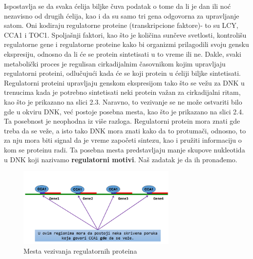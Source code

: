 Ispostavlja se da svaka ćelija biljke čuva podatak o tome da li je dan ili noć nezavisno od drugih ćelija, kao i da su samo tri gena odgovorna za upravljanje satom. Oni kodiraju regulatorne proteine (transkripcione faktore)- to su LCY, CCA1 i TOC1. Spoljašnji faktori, kao što je količina sunčeve svetlosti, kontrolišu regulatorne gene i regulatorne proteine kako bi organizmi prilagodili svoju gensku ekspresiju, odnosno da li će se protein sintetisati u to vreme ili ne. Dakle, svaki metabolički proces je regulisan cirkadijalnim časovnikom kojim upravljaju regulatorni proteini, odlučujući kada će se koji protein u ćeliji biljke sintetisati. Regulatorni proteini upravljaju genskom ekspresijom tako što se vežu za DNK u trenucima kada je potrebno sintetisati neki protein važan za cirkadijalni ritam, kao što je prikazano na slici 2.3. Naravno, to vezivanje se ne može ostvariti bilo gde u okviru DNK, već postoje posebna mesta, kao što je prikazano na slici 2.4. Ta posebnost je neophodna iz više razloga. Regulatorni protein mora znati gde treba da se veže, a isto tako DNK mora znati kako da to protumači, odnosno, to za nju mora biti signal da je vreme započeti sintezu, kao i pružiti informaciju o kom se proteinu radi. Ta posebna mesta predstavljaju manje skupove nukleotida u DNK koji nazivamo \textbf{regulatorni motivi}. Naš zadatak je da ih pronađemo. 

\begin{figure}[h]
\caption{Mesta vezivanja regulatornih proteina}
\centering
\includegraphics[width=0.7\textwidth]{poglavlja/2/slike/16.PNG}
\end{figure}


